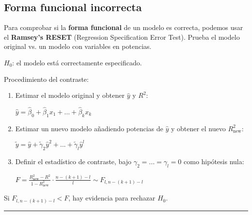 \documentclass[10pt, a4paper, landscape]{extarticle}
\begin{document}
\begin{multicols}{3}
\section*{Forma funcional incorrecta}
	Para comprobar si la \textbf{forma funcional} de un modelo es correcta, podemos usar el \textbf{Ramsey's RESET} (Regression Specification Error Test). Prueba el modelo original vs. un modelo con variables en potencias.
	\begin{center}
		$H_0$: el modelo está correctamente especificado.
	\end{center}
	Procedimiento del contraste:
	\begin{enumerate}[leftmargin=*]
		\item Estimar el modelo original y obtener $\hat{y}$ y $R^2$:
		\begin{center}
			$\hat{y} = \hat{\beta}_0 + \hat{\beta}_1 x_1 + ... + \hat{\beta}_k x_k$
		\end{center}
		\item Estimar un nuevo modelo añadiendo potencias de $\hat{y}$ y obtener el nuevo $R^2_{\mathrm{new}}$:
		\begin{center}
			$\tilde{y} = \hat{y} + \tilde{\gamma}_2 \hat{y}^2 + ... + \tilde{\gamma}_l \hat{y}^l$
		\end{center}
		\item Definir el estadístico de contraste, bajo $\gamma_2 = ... = \gamma_l = 0$ como hipótesis nula:
		\begin{center}
			$F = \frac{R^2_{\mathrm{new}} - R^2}{1 - R^2_{\mathrm{new}}} \cdot \frac{n-(k+1)-l}{l} \sim F_{l, n-(k+1)-l}$
		\end{center}
	\end{enumerate}
	Si $F_{l, n-(k+1)-l} < F$, hay evidencia para rechazar $H_0$.
\end{multicols}

\noindent\rule{\textwidth}{0.4pt} %
\end{document}
